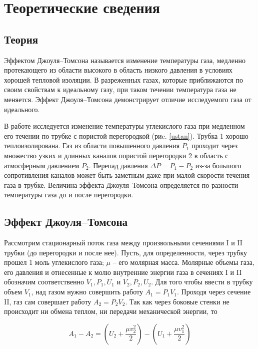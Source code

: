 \documentclass[a4paper,12pt]{article}
\begin{document}
\section{Теоретические сведения}

\subsection{Теория}

Эффектом Джоуля–Томсона называется изменение температуры газа, медленно протекающего из области высокого в область низкого давления в условиях хорошей тепловой изоляции. В разреженных газах, которые приближаются по своим свойствам к идеальному газу, при таком течении температура газа не меняется. Эффект Джоуля–Томсона демонстрирует отличие исследуемого газа от идеального.

В работе исследуется изменение температуры углекислого газа при медленном его течении по трубке с пористой перегородкой (риc. \ref{ustan}). Трубка 1 хорошо теплоизолирована. Газ из области повышенного давления $ P_1 $ проходит через множество узких и длинных каналов пористой перегородки 2 в область с атмосферным давлением $ P_2 $. Перепад давления $ \Delta P = P_1 - P_2 $ из-за большого сопротивления каналов может быть заметным даже при малой скорости течения газа в трубке. Величина эффекта Джоуля–Томсона определяется по разности температуры газа до и после перегородки.

\subsection{Эффект Джоуля–Томсона}

Рассмотрим стационарный поток газа между произвольными сечениями I и II трубки (до перегородки и после нее). Пусть, для определенности, через трубку прошел 1 моль углекислого газа; $ \mu $ -- его молярная масса. Молярные объемы газа, его давления и отнесенные к молю внутренние энергии газа в сечениях I и II обозначим соответственно $ V_1, P_1, U_1 $ и $ V_2, P_2, U_2 $. Для того чтобы ввести в трубку объем $ V_1 $, над газом нужно совершить работу $ A_1 = P_1V_1 $. Проходя через сечение II, газ сам совершает работу $ A_2 = P_2V_2 $. Так как через боковые стенки не происходит ни обмена теплом, ни передачи механической энергии, то

\begin{equation}\label{1}
    A_1 - A_2 = \left( U_2 + \frac{\mu v_2^2}{2} \right) - \left( U_1 + \frac{\mu v_1^2}{2} \right)
\end{equation}
\end{document}
